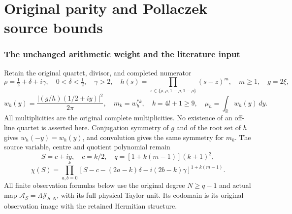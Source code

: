 \documentclass[11pt]{article}
\begin{document}

\clearpage\begingroup
\part*{Original parity and Pollaczek source bounds}
\newtheorem{paritytheorem}{Theorem}
\newtheorem{parityproposition}[paritytheorem]{Proposition}
\newtheorem{paritylemma}[paritytheorem]{Lemma}
\newcommand{\parityR}{\mathbb R}
\newcommand{\parityC}{\mathbb C}
\newcommand{\parityN}{\mathbb N}
\newcommand{\parityPol}{\mathbb C[x]}
\newcommand{\paritydiag}{\operatorname{diag}}
\newcommand{\parityRan}{\operatorname{Ran}}



\section{The unchanged arithmetic weight and the literature input}

Retain the original quartet, divisor, and completed numerator
\[
 \rho=\tfrac12+\delta+i\gamma,\quad 0<\delta<\tfrac12,\quad\gamma>2,
 \quad h(s)=\prod_{z\in\{\rho,\bar\rho,1-\rho,1-\bar\rho\}}(s-z)^m,
 \quad m\geq1,\quad g=2\xi,
\]
\[
 w_h(y)=\frac{|(g/h)(1/2+iy)|^2}{2\pi},\quad
 m_k=w_h^{*k},\quad k=4l+1\geq9,\quad
 \mu_h=\int_\parityR w_h(y)\,dy.
\]
All multiplicities are the original complete multiplicities. No
existence of an off-line quartet is asserted here. Conjugation
symmetry of $g$ and of the root set of $h$ gives $w_h(-y)=w_h(y)$,
and convolution gives the same symmetry for $m_k$.
The source variable, centre and quotient polynomial remain
\[
 S=c+iy,\quad c=k/2,\quad q=[1+k(m-1)](k+1)^2,
\]
\[
 \chi(S)=\prod_{a,b=0}^k
 [S-c-(2a-k)\delta-i(2b-k)\gamma]^{1+k(m-1)}.
\]
All finite observation formulas below use the original degree
$N\geq q-1$ and actual map $\mathcal A_S=\Lambda\mathcal J_{S,N}$,
with its full physical Taylor unit. Its codomain is its original
observation image with the retained Hermitian structure.
\end{document}
